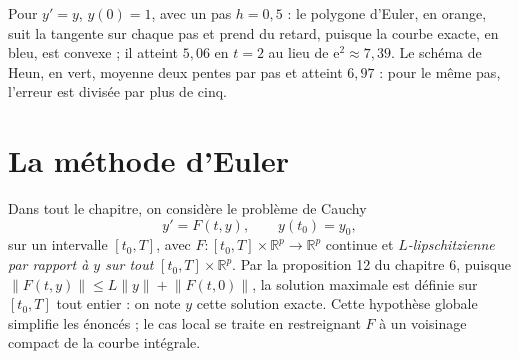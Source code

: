 \documentclass[a4paper,twoside]{report}
\newcommand{\R}{\mathbb{R}}
\newcommand{\ee}{\mathrm{e}}                      %
\newcommand{\norme}[1]{\lVert #1 \rVert}         %
\begin{document}
\vfill
\noindent\begin{minipage}[c]{8.1cm}
\end{minipage}\hfill
\begin{minipage}[c]{7.6cm}
Pour $y' = y$, $y(0) = 1$, avec un pas $h = 0{,}5$ : le polygone d'Euler, en orange, suit la tangente sur chaque pas et prend du retard, puisque la courbe exacte, en bleu, est convexe ; il atteint $5{,}06$ en $t = 2$ au lieu de $\ee^{2} \approx 7{,}39$. Le schéma de Heun, en vert, moyenne deux pentes par pas et atteint $6{,}97$ : pour le même pas, l'erreur est divisée par plus de cinq.
\end{minipage}
\vfill
\newpage
\section{La méthode d'Euler}

Dans tout le chapitre, on considère le problème de Cauchy
\[ y' = F(t, y), \qquad y(t_{0}) = y_{0}, \]
sur un intervalle $[t_{0}, T]$, avec $F : [t_{0}, T] \times \R^{p} \to \R^{p}$ continue et \emph{$L$-lipschitzienne par rapport à $y$ sur tout} $[t_{0}, T] \times \R^{p}$. Par la proposition 12 du chapitre 6, puisque $\norme{F(t, y)} \leqslant L\norme{y} + \norme{F(t, 0)}$, la solution maximale est définie sur $[t_{0}, T]$ tout entier : on note $y$ cette solution exacte. Cette hypothèse globale simplifie les énoncés ; le cas local se traite en restreignant $F$ à un voisinage compact de la courbe intégrale.
\end{document}
